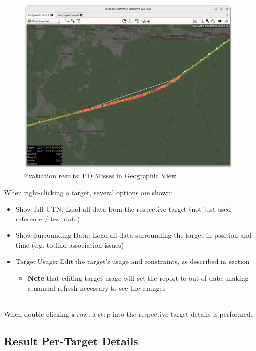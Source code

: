 \begin{figure}[H]
  \hspace*{-2.5cm}
    \includegraphics[width=19cm]{figures/eval_results_single_geoview.png}
  \caption{Evaluation results: PD Misses in Geographic View}
\end{figure}

When right-clicking a target, several options are shown:

\begin{itemize}  
\item Show full UTN: Load all data from the respective target (not just used reference / test data)
\item Show Surrounding Data: Load all data surrounding the target in position and time (e.g. to find association issues)
\item Target Usage: Edit the target's usage and constraints, as described in section 
\begin{itemize} 
  \item \textbf{Note} that editing target usage will set the report to out-of-date, making a manual refresh necessary to see the changes
\end{itemize}  
\end{itemize}  
\ \\

When double-clicking a row, a step into the respective target details is performed.

\subsection{Result Per-Target Details}

